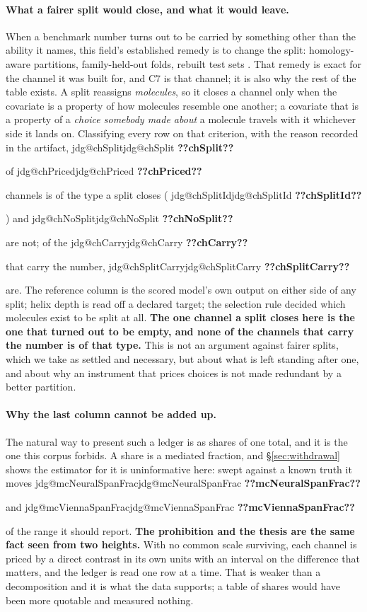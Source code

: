 \documentclass[11pt]{article}
\makeatletter
\newcommand{\jdg}[1]{%
  \ifcsname jdg@#1\endcsname\csname jdg@#1\endcsname
  \else\textbf{??#1??}\PackageError{nm}{undefined measured quantity #1}{}\fi}
\makeatother
\begin{document}
\paragraph{What a fairer split would close, and what it would leave.} When a benchmark number turns
out to be carried by something other than the ability it names, this field's established remedy is
to change the split: homology-aware partitions, family-held-out folds, rebuilt test sets
\citep{szikszai2022generalize,flamm2022caveats,qiu2023sequence,chanrg2026,szikszai2026gauging}.
That remedy is exact for the channel it was built for, and C7 is that channel; it is also why the
rest of the table exists. A split reassigns \emph{molecules}, so it closes a channel only when the
covariate is a property of how molecules resemble one another; a covariate that is a property of a
\emph{choice somebody made about} a molecule travels with it whichever side it lands on. Classifying every row on that criterion, with the reason recorded in the artifact, \jdg{chSplit} of
\jdg{chPriced} channels is of the type a split closes (\jdg{chSplitId}) and \jdg{chNoSplit} are
not; of the \jdg{chCarry} that carry the number, \jdg{chSplitCarry} are. The reference column is
the scored model's own output on either side of any split; helix depth is read off a declared
target; the selection rule decided which molecules exist to be split at all. \textbf{The one channel a split closes here is the one that turned out to be empty, and
none of the channels that carry the number is of that type.} This is not an argument against fairer splits, which we take as settled and necessary, but about
what is left standing after one, and about why an instrument that prices choices is not made
redundant by a better partition.

\paragraph{Why the last column cannot be added up.} The natural way to present such a ledger is as shares of one total, and it is the one this corpus
forbids. A share is a mediated fraction,
and \S\ref{sec:withdrawal} shows the estimator for it is uninformative here: swept against a known
truth it moves \jdg{mcNeuralSpanFrac} and \jdg{mcViennaSpanFrac} of the range it should report.
\textbf{The prohibition and the thesis are the same fact seen from two heights.} With no common
scale surviving, each channel is priced by a direct contrast in its own units with an interval on
the difference that matters, and the ledger is read one row at a time.
That is weaker than a decomposition and it is what the data supports; a table of shares would have
been more quotable and measured nothing.
\end{document}
